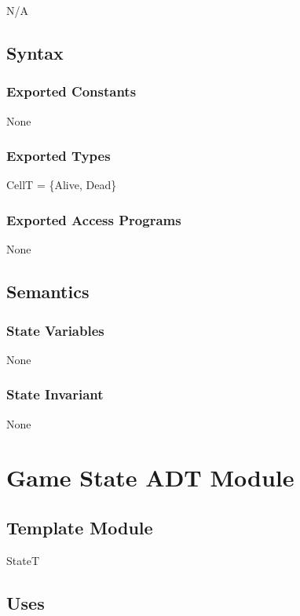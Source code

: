 \documentclass[12pt]{article}
\begin{document}
N/A

\subsection* {Syntax}

\subsubsection* {Exported Constants}

None

\subsubsection* {Exported Types}

CellT = \{Alive, Dead\}

\subsubsection* {Exported Access Programs}

None

\subsection* {Semantics}

\subsubsection* {State Variables}

None

\subsubsection* {State Invariant}

None

\newpage


\section* {Game State ADT Module}

\subsection* {Template Module}

StateT

\subsection* {Uses}
\end{document}
